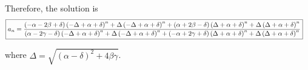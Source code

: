 \documentclass[a4paper, 11pt]{article}
\begin{document}
\begin{landscape}
Therefore, the solution is
\begin{align*}
\Aboxed{
a_n = \frac{(-\alpha -2 \beta +\delta ) \left(-\Delta+\alpha +\delta \right)^n+\Delta \left(-\Delta+\alpha +\delta \right)^n+(\alpha +2 \beta -\delta ) \left(\Delta+\alpha +\delta \right)^n+\Delta \left(\Delta+\alpha +\delta \right)^n}{(\alpha -2 \gamma -\delta ) \left(-\Delta+\alpha +\delta \right)^n+\Delta \left(-\Delta+\alpha +\delta \right)^n+(-\alpha +2 \gamma +\delta ) \left(\Delta+\alpha +\delta \right)^n+\Delta \left(\Delta+\alpha +\delta \right)^n}}
\end{align*}

where $\Delta = \sqrt{(\alpha - \delta)^2 + 4 \beta \gamma}$.

\end{landscape}
\end{document}
